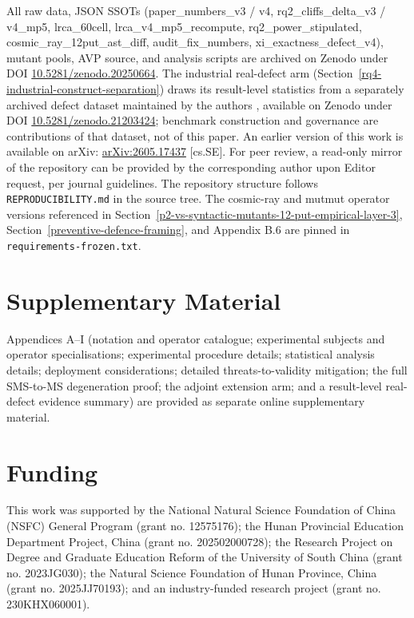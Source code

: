 \documentclass[manuscript,screen,review]{acmart}
\begin{document}
All raw data, JSON SSOTs (paper\_numbers\_v3 / v4,
rq2\_cliffs\_delta\_v3 / v4\_mp5, lrca\_60cell,
lrca\_v4\_mp5\_recompute, rq2\_power\_stipulated,
cosmic\_ray\_12put\_ast\_diff, audit\_fix\_numbers,
xi\_exactness\_defect\_v4), mutant pools, AVP source, and analysis
scripts are archived on Zenodo under DOI
\href{https://doi.org/10.5281/zenodo.20250664}{10.5281/zenodo.20250664}.
The industrial real-defect arm (Section~\ref{rq4-industrial-construct-separation}) draws its result-level
statistics from a separately archived defect dataset maintained by the
authors \citep{defect4mr2026}, available on Zenodo under DOI
\href{https://doi.org/10.5281/zenodo.21203424}{10.5281/zenodo.21203424};
benchmark construction and governance are contributions of that dataset,
not of this paper.
An earlier version of this work is available on arXiv:
\href{https://arxiv.org/abs/2605.17437}{arXiv:2605.17437} [cs.SE].
For peer review, a read-only mirror of the repository can
be provided by the corresponding author upon Editor request, per journal
guidelines. The repository structure follows
\texttt{REPRODUCIBILITY.md} in the source tree. The cosmic-ray and
mutmut operator versions referenced in Section~\ref{p2-vs-syntactic-mutants-12-put-empirical-layer-3}, Section~\ref{preventive-defence-framing}, and Appendix B.6 are
pinned in \texttt{requirements-frozen.txt}.



\section*{Supplementary Material}

Appendices A--I (notation and operator catalogue; experimental subjects and
operator specialisations; experimental procedure details; statistical analysis
details; deployment considerations; detailed threats-to-validity mitigation;
the full SMS-to-MS degeneration proof; the adjoint extension arm; and a
result-level real-defect evidence summary) are provided as separate online
supplementary material.

\section*{Funding}

This work was supported by the National Natural Science Foundation of China
(NSFC) General Program (grant no. 12575176); the Hunan Provincial Education
Department Project, China (grant no. 202502000728); the Research Project on
Degree and Graduate Education Reform of the University of South China (grant
no. 2023JG030); the Natural Science Foundation of Hunan Province, China (grant
no. 2025JJ70193); and an industry-funded research project (grant no.
230KHX060001).
\end{document}
